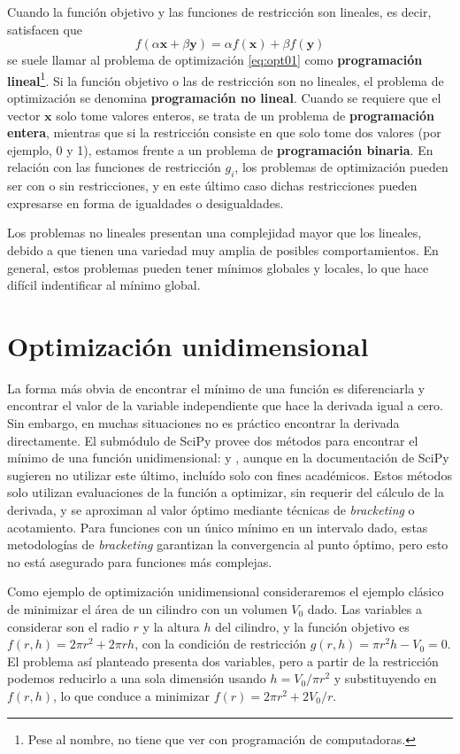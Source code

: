 Cuando la función objetivo y las funciones de restricción son lineales, es decir, satisfacen que
\[ f(\alpha \bm{x} + \beta \bm{y}) = \alpha f(\bm{x}) + \beta f(\bm{y}) \]
se suele llamar al problema de optimización \eqref{eq:opt01} como \textbf{programación lineal}\footnote{Pese al nombre, no tiene que ver con programación de computadoras.}. Si la función objetivo o las de restricción son no lineales, el problema de optimización se denomina \textbf{programación no lineal}. Cuando se requiere que el vector $\bm{x}$ solo tome valores enteros, se trata de un problema de \textbf{programación entera}, mientras que si la restricción consiste en que solo tome dos valores (por ejemplo, 0 y 1), estamos frente a un problema de \textbf{programación binaria}. En relación con las funciones de restricción $g_i$, los problemas de optimización pueden ser con o sin restricciones, y en este último caso dichas restricciones pueden expresarse en forma de igualdades o desigualdades.

Los problemas no lineales presentan una complejidad mayor que los lineales, debido a que tienen una variedad muy amplia de posibles comportamientos. En general, estos problemas pueden tener mínimos globales y locales, lo que hace difícil indentificar al mínimo global. 


\section{Optimización unidimensional}
La forma más obvia de encontrar el mínimo de una función es diferenciarla y encontrar el valor de la variable independiente que hace la derivada igual a cero. Sin embargo, en muchas situaciones no es práctico encontrar la derivada directamente. El submódulo  de SciPy provee dos métodos para encontrar el mínimo de una función unidimensional:  y , aunque en la documentación de SciPy sugieren no utilizar este último, incluído solo con fines académicos. Estos métodos solo utilizan evaluaciones de la función a optimizar, sin requerir del cálculo de la derivada, y se aproximan al valor óptimo mediante técnicas de \textit{bracketing} o acotamiento. Para funciones con un único mínimo en un intervalo dado, estas metodologías de \textit{bracketing} garantizan la convergencia al punto óptimo, pero esto no está asegurado para funciones más complejas.

Como ejemplo de optimización unidimensional consideraremos el ejemplo clásico de minimizar el área de un cilindro con un volumen $V_0$ dado. Las variables a considerar son el radio $r$ y la altura $h$ del cilindro, y la función objetivo es $f(r, h) = 2 \pi r^2 + 2 \pi r h$, con la condición de restricción $g(r, h) = \pi r^2 h - V_0 = 0$. El problema así planteado presenta dos variables, pero a partir de la restricción podemos reducirlo a una sola dimensión usando $h = V_0/\pi r^2$ y substituyendo en $f(r, h)$, lo que conduce a minimizar $f(r) = 2 \pi r^2 + 2 V_0 / r$.


